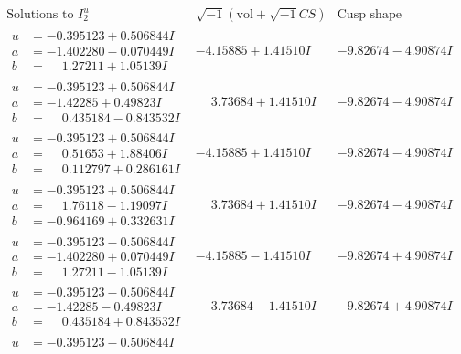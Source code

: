 \documentclass[1p]{elsarticle_modified}
\theoremstyle{definition}
\newcommand{\I}{\sqrt{-1}}
\begin{document}
$$\begin{array}{c|c|c}  
\text{Solutions to }I^u_{2}& \I (\text{vol} + \sqrt{-1}CS) & \text{Cusp shape}\\
 \hline 
\begin{aligned}
u &= -0.395123 + 0.506844 I \\
a &= -1.402280 - 0.070449 I \\
b &= \phantom{-}1.27211 + 1.05139 I\end{aligned}
 & -4.15885 + 1.41510 I & -9.82674 - 4.90874 I \\ \hline\begin{aligned}
u &= -0.395123 + 0.506844 I \\
a &= -1.42285 + 0.49823 I \\
b &= \phantom{-}0.435184 - 0.843532 I\end{aligned}
 & \phantom{-}3.73684 + 1.41510 I & -9.82674 - 4.90874 I \\ \hline\begin{aligned}
u &= -0.395123 + 0.506844 I \\
a &= \phantom{-}0.51653 + 1.88406 I \\
b &= \phantom{-}0.112797 + 0.286161 I\end{aligned}
 & -4.15885 + 1.41510 I & -9.82674 - 4.90874 I \\ \hline\begin{aligned}
u &= -0.395123 + 0.506844 I \\
a &= \phantom{-}1.76118 - 1.19097 I \\
b &= -0.964169 + 0.332631 I\end{aligned}
 & \phantom{-}3.73684 + 1.41510 I & -9.82674 - 4.90874 I \\ \hline\begin{aligned}
u &= -0.395123 - 0.506844 I \\
a &= -1.402280 + 0.070449 I \\
b &= \phantom{-}1.27211 - 1.05139 I\end{aligned}
 & -4.15885 - 1.41510 I & -9.82674 + 4.90874 I \\ \hline\begin{aligned}
u &= -0.395123 - 0.506844 I \\
a &= -1.42285 - 0.49823 I \\
b &= \phantom{-}0.435184 + 0.843532 I\end{aligned}
 & \phantom{-}3.73684 - 1.41510 I & -9.82674 + 4.90874 I \\ \hline\begin{aligned}
u &= -0.395123 - 0.506844 I \\

\end{aligned}
\end{array}$$
\end{document}
